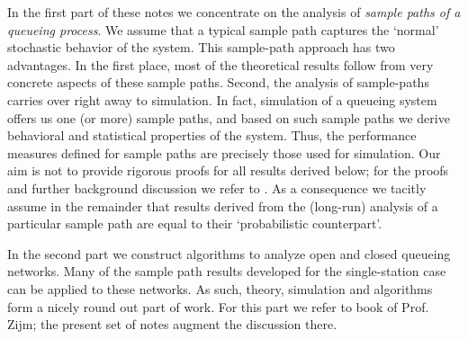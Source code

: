 In the first part of these notes we concentrate on the analysis of
\emph{sample paths of a queueing process}. We assume that a typical
sample path captures the `normal' stochastic behavior of the
system. This sample-path approach has two advantages. In the first
place, most of the theoretical results follow from very concrete
aspects of these sample paths. Second, the analysis of sample-paths
carries over right away to simulation. In fact, simulation of a
queueing system offers us one (or more) sample paths, and based on
such sample paths we derive behavioral and statistical properties of
the system. Thus, the performance measures defined for sample paths
are precisely those used for simulation.  Our aim is not to provide
rigorous proofs for all results derived below; for the proofs and
further background discussion we refer to
\cite{el-taha98:_sampl_path_analy_queuein_system}. As a consequence we tacitly
assume in the remainder that results derived from the (long-run)
analysis of a particular sample path are equal to their `probabilistic
counterpart'. 

In the second part we construct algorithms to analyze open and closed
queueing networks. Many of the sample path results developed for the
single-station case can be applied to these networks. As such, theory,
simulation and algorithms form a nicely round out part of work.  For
this part we refer to book of Prof. Zijm; the present set of notes
augment the discussion there.


